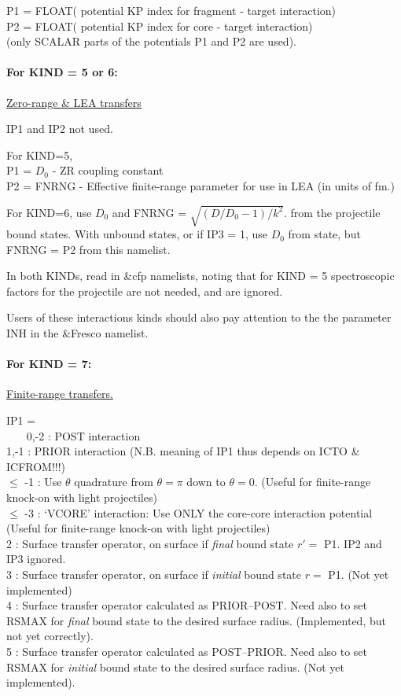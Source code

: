 \documentclass[11pt]{article}
\begin{document}
\begin{description}

 P1  = FLOAT( potential KP index for fragment - target interaction) \\
 P2  = FLOAT( potential KP index for core     - target interaction) \\
        (only SCALAR parts of the potentials P1 and P2 are used).

\paragraph{For KIND = 5 or 6:}
\underline{Zero-range \& LEA transfers}

IP1 and IP2 not used.

For KIND=5,
\\  P1 = $D_0$    - ZR coupling constant
\\  P2 = FNRNG - Effective finite-range parameter for use
in LEA (in units of fm.)

For KIND=6, use $D_0$ and FNRNG = $\sqrt{(D/D_0 - 1)/k^2}$. from the projectile
bound states.  With unbound states, or if IP3 = 1,
use $D_0$ from state, but FNRNG = P2
from this namelist.

 In both KINDs, read in \&cfp namelists, noting that for KIND = 5
spectroscopic factors for the projectile are not needed, and are ignored.

Users of these interactions kinds should also pay attention to the
the parameter INH in the \&Fresco namelist.

\paragraph{For KIND = 7:}
\underline{Finite-range transfers.}


IP1 =\\
~~~  0,-2 : POST interaction
\\  1,-1 : PRIOR interaction
 (N.B. meaning of IP1 thus depends on ICTO \& ICFROM!!!)
\\  $\le$ -1 : Use $\theta$ quadrature from $\theta = \pi$ down to $\theta = 0$.
 (Useful for finite-range knock-on with light projectiles)
\\  $\le$ -3 : `VCORE' interaction:
Use ONLY the core-core interaction potential
 (Useful for finite-range knock-on with light projectiles)
\\ 2 : Surface transfer operator, on surface if {\em final} bound state $r' =$ P1. IP2 and IP3 ignored.
\\ 3 : Surface transfer operator, on surface if {\em initial} bound state $r =$ P1. (Not yet implemented)
\\ 4 : Surface transfer operator calculated as PRIOR--POST. Need also to set RSMAX for {\em final} bound state to the desired surface radius. 
   (Implemented, but not yet correctly).
\\ 5 : Surface transfer operator calculated as POST--PRIOR. Need also to set RSMAX for {\em initial} bound state to the desired surface radius. 
   (Not yet implemented).



\end{description}
\end{document}

